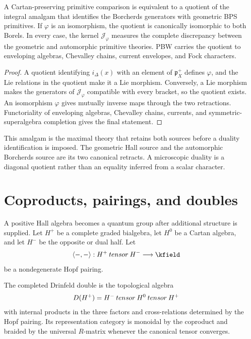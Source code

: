 \begin{theorem}
A Cartan-preserving primitive comparison is equivalent to a quotient of the integral amalgam that identifies the Borcherds generators with geometric BPS primitives.  If $\varphi$ is an isomorphism, the quotient is canonically isomorphic to both Borels.  In every case, the kernel $\mathcal J_\varphi$ measures the complete discrepancy between the geometric and automorphic primitive theories.  PBW carries the quotient to enveloping algebras, Chevalley chains, current envelopes, and Fock characters.
\end{theorem}
\begin{proof}
A quotient identifying $i_\Delta(x)$ with an element of $\mathfrak p_X^+$ defines $\varphi$, and the Lie relations in the quotient make it a Lie morphism.  Conversely, a Lie morphism makes the generators of $\mathcal J_\varphi$ compatible with every bracket, so the quotient exists.  An isomorphism $\varphi$ gives mutually inverse maps through the two retractions.  Functoriality of enveloping algebras, Chevalley chains, currents, and symmetric-superalgebra completion gives the final statement.
\end{proof}

This amalgam is the maximal theory that retains both sources before a duality identification is imposed.  The geometric Hall source and the automorphic Borcherds source are its two canonical retracts.  A microscopic duality is a diagonal quotient rather than an equality inferred from a scalar character.

\chapter{Coproducts, pairings, and doubles}
A positive Hall algebra becomes a quantum group after additional structure is supplied. Let $H^+$ be a complete graded bialgebra, let $H^0$ be a Cartan algebra, and let $H^-$ be the opposite or dual half. Let
\[
 \angles{-,-}:H^+\widehattensor H^-\longrightarrow\kfield
\]
be a nondegenerate Hopf pairing.

\begin{definition}
The completed Drinfeld double is the topological algebra
\[
 D(H^+)=H^-\mathbin{tensor} H^0\mathbin{tensor} H^+
\]
with internal products in the three factors and cross-relations determined by the Hopf pairing. Its representation category is monoidal by the coproduct and braided by the universal $R$-matrix whenever the canonical tensor converges.
\end{definition}


